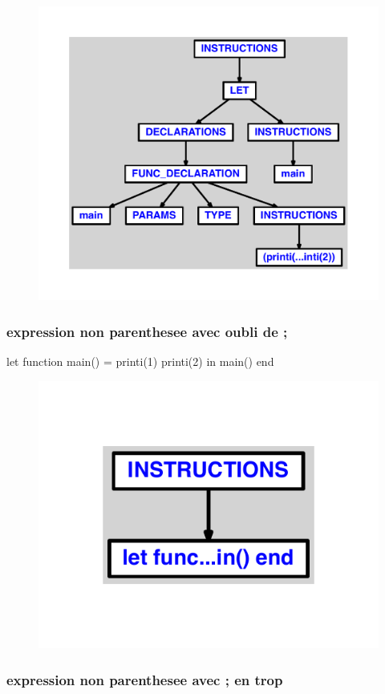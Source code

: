 \documentclass{article}
\begin{document}
\begin{figure}[H]\centering\includegraphics[max width=\textwidth]{ast/ast_35.pdf}\end{figure}\subsubsection{expression non parenthesee avec oubli de ;}
\begin{verbatimtab}
let function main() = printi(1) printi(2) in main() end
\end{verbatimtab}
\begin{figure}[H]\centering\includegraphics[max width=\textwidth]{ast/ast_36.pdf}\end{figure}\subsubsection{expression non parenthesee avec ; en trop}
\end{document}
